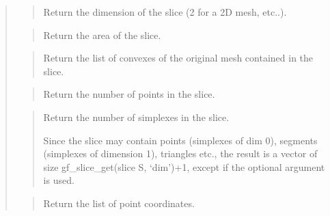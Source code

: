 \documentclass[a4paper,11pt,english]{sphinxmanual}
\begin{document}
\begin{quote}

\begin{quote}

Return the dimension of the slice (2 for a 2D mesh, etc..).
\end{quote}

\begin{quote}

Return the area of the slice.
\end{quote}

\begin{quote}

Return the list of convexes of the original mesh contained in the slice.
\end{quote}

\begin{quote}

Return the number of points in the slice.
\end{quote}

\begin{quote}

Return the number of simplexes in the slice.

Since the slice may contain points (simplexes of dim 0), segments
(simplexes of dimension 1), triangles etc., the result is a vector
of size gf\_slice\_get(slice S, ‘dim’)+1, except if the optional argument 
is used.
\end{quote}

\begin{quote}

Return the list of point coordinates.
\end{quote}

\begin{quote}


\end{quote}
\end{quote}
\end{document}
